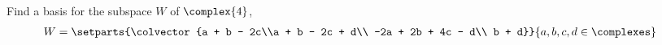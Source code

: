 Find a basis for the subspace $W$ of $\complex{4}$,
%
\begin{align*}
W &= 
\setparts{\colvector{a + b - 2c\\a + b - 2c + d\\ -2a + 2b + 4c - d\\ b + d}}
{a, b, c, d \in\complexes}
\end{align*}
%
